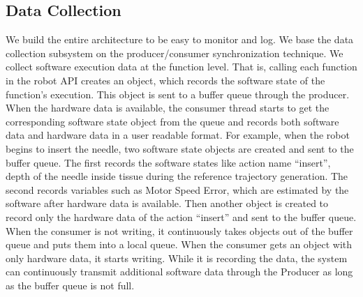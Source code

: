 \subsection{Data Collection}\label{subsec:datacollection}
We build the entire architecture to be easy to monitor and log. We base the data collection subsystem on the producer/consumer synchronization technique. We collect software execution data at the function level. That is, calling each function in the robot API
creates an object, which records the software state of the function's execution. This object is sent to a buffer queue through the producer. When the hardware data is available, the consumer thread starts to get the corresponding software state object from the queue and records both software data and hardware data in a user readable format. For example, when the robot begins to insert the needle, two software state objects are created and sent to the buffer queue. The first records the software states like action name ``insert'', depth of the needle inside tissue during the reference trajectory generation. The second records variables such as Motor Speed Error, which are estimated by the software after hardware data is available. Then another object is created to record only the hardware data of the action ``insert'' and sent to the buffer queue. When the consumer is not writing, it continuously takes objects out of the buffer queue and puts them into a local queue. When the consumer gets an object with only hardware data, it starts writing. While it is recording the data, the system can continuously transmit additional software data through the Producer as long as the buffer queue is not full.

